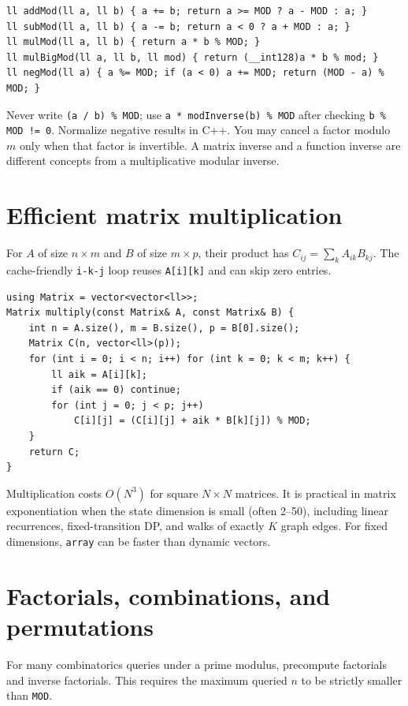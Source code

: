 \begin{lstlisting}
ll addMod(ll a, ll b) { a += b; return a >= MOD ? a - MOD : a; }
ll subMod(ll a, ll b) { a -= b; return a < 0 ? a + MOD : a; }
ll mulMod(ll a, ll b) { return a * b % MOD; }
ll mulBigMod(ll a, ll b, ll mod) { return (__int128)a * b % mod; }
ll negMod(ll a) { a %= MOD; if (a < 0) a += MOD; return (MOD - a) % MOD; }
\end{lstlisting}

Never write \texttt{(a / b) \% MOD}; use \texttt{a * modInverse(b) \% MOD} after checking \texttt{b \% MOD != 0}. Normalize negative results in C++. You may cancel a factor modulo $m$ only when that factor is invertible. A matrix inverse and a function inverse are different concepts from a multiplicative modular inverse.

\section{Efficient matrix multiplication}

For $A$ of size $n \times m$ and $B$ of size $m \times p$, their product has $C_{ij}=\sum_k A_{ik}B_{kj}$. The cache-friendly \texttt{i-k-j} loop reuses \texttt{A[i][k]} and can skip zero entries.

\begin{lstlisting}
using Matrix = vector<vector<ll>>;
Matrix multiply(const Matrix& A, const Matrix& B) {
    int n = A.size(), m = B.size(), p = B[0].size();
    Matrix C(n, vector<ll>(p));
    for (int i = 0; i < n; i++) for (int k = 0; k < m; k++) {
        ll aik = A[i][k];
        if (aik == 0) continue;
        for (int j = 0; j < p; j++)
            C[i][j] = (C[i][j] + aik * B[k][j]) % MOD;
    }
    return C;
}
\end{lstlisting}

Multiplication costs $O(N^3)$ for square $N \times N$ matrices. It is practical in matrix exponentiation when the state dimension is small (often 2--50), including linear recurrences, fixed-transition DP, and walks of exactly $K$ graph edges. For fixed dimensions, \texttt{array} can be faster than dynamic vectors.

\section{Factorials, combinations, and permutations}

For many combinatorics queries under a prime modulus, precompute factorials and inverse factorials. This requires the maximum queried $n$ to be strictly smaller than \texttt{MOD}.

